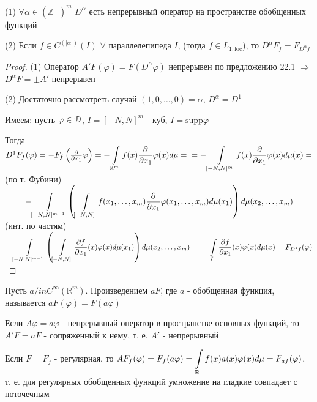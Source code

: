 \documentclass[a4paper,12pt]{report}
\newcommand*{\hm}[1]{#1\nobreak\discretionary{}%
            {\hbox{$\mathsurround=0pt #1$}}{}}
\begin{document}
\begin{thm}
(1) $\forall\alpha\in(\mathbb Z_+)^m$ $D^\alpha$ есть непрерывный оператор на пространстве обобщенных функций

(2) Если $f\in C^{(|\alpha|)}(I)$ $\forall$ параллелепипеда $I$, (тогда $f\in L_{1,\mathrm{loc}}$), то $D^\alpha F_f=F_{D^\alpha f}$
\end{thm}
\begin{proof}
(1) Оператор $A'F(\varphi)=F(D^\alpha\varphi)$ непрерывен по предложению 22.1 $\Rightarrow$ $D^\alpha F=\pm A'$ непрерывен

(2) Достаточно рассмотреть случай $(1,0,\ldots,0)=\alpha$, $D^\alpha=D^1$

Имеем: пусть $\varphi\in\EuScript D$, $I=[-N,N]^m$ - куб, $I=\mathrm{supp}\varphi$

Тогда $D^1F_f(\varphi)=-F_f\left(\frac{\partial}{\partial x_1}\varphi\right)=-\displaystyle\int\limits_{\mathbb R^m}f(x)\frac{\partial}{\partial x_1}\varphi(x)d\mu=\\
=-\displaystyle\int\limits_{[-N,N]^m}f(x)\frac{\partial}{\partial x_1}\varphi(x)d\mu(x)=$(по т. Фубини)$=\\
=-\displaystyle\int\limits_{[-N,N]^{m-1}}\left(\displaystyle\int\limits_{[-N,N]}f(x_1,\ldots,x_m)\frac{\partial}{\partial x_1}\varphi(x_1,\ldots,x_m)d\mu(x_1)\right)d\mu(x_2,\ldots,x_m)=\\
=$(инт. по частям)$=\displaystyle\int\limits_{[-N,N]^{m-1}}\left(\displaystyle\int\limits_{[-N,N]}\frac{\partial f}{\partial x_1}(x)\varphi(x)d\mu(x_1)\right)d\mu(x_2,\ldots,x_m)=\\=\displaystyle\int\limits_I\frac{\partial f}{\partial x_1}(x)\varphi(x)d\mu(x)=F_{D^1f}(\varphi)$
\end{proof}


\begin{df}
Пусть $a/in C^\infty(\mathbb R^m)$. Произведением $aF$, где $a$ - обобщенная функция, называется $aF(\varphi)=F(a\varphi)$

Если $A\varphi=a\varphi$ - непрерывный оператор в пространстве основных функций, то $A'F=aF$ - сопряженный к нему, т. е. $A'$ - непрерывный

Если $F=F_f$ - регулярная, то $AF_f(\varphi)=F_f(a\varphi)=\displaystyle\int\limits_{\mathbb R}f(x)a(x)\varphi(x)d\mu\hm=F_{af}(\varphi)$, т. е. для регулярных обобщенных функций умножение на гладкие совпадает с поточечным
\end{df}
\end{document}

